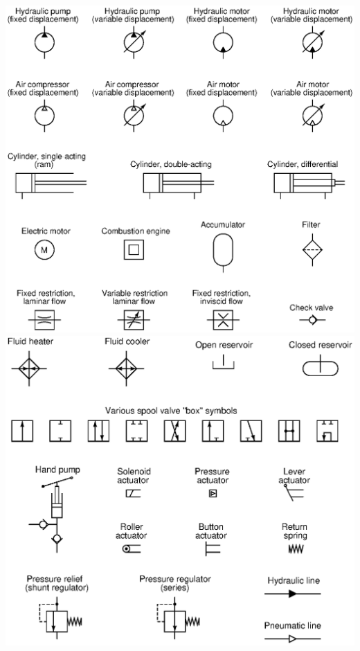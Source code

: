 \documentclass[10pt,a5paper]{article}
\begin{document}
\includegraphics[width=1\textwidth]{diagrams11.eps}
\includegraphics[width=1\textwidth]{diagrams12.eps}
\end{document}
